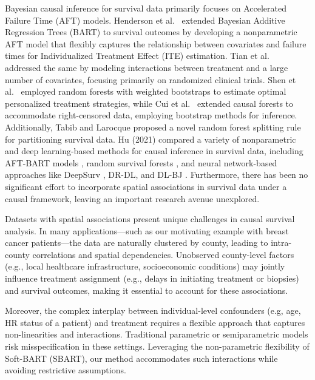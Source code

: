 \documentclass[useAMS,referee]{biom}
\begin{document}
Bayesian causal inference for survival data primarily focuses on Accelerated Failure Time (AFT) models. Henderson et al.\ \parencite{henderson2017bayesian} extended Bayesian Additive Regression Trees (BART) to survival outcomes by developing a nonparametric AFT model that flexibly captures the relationship between covariates and failure times for Individualized Treatment Effect (ITE) estimation. Tian et al.\ \parencite{tian2014survival} addressed the same by modeling interactions between treatment and a large number of covariates, focusing primarily on randomized clinical trials. Shen et al.\ \parencite{shen2018personalized} employed random forests with weighted bootstraps to estimate optimal personalized treatment strategies, while Cui et al.\ \parencite{cui2017causal} extended causal forests \parencite{wager2018estimation} to accommodate right-censored data, employing bootstrap methods for inference. Additionally, Tabib and Larocque \parencite{tabib2018splitting} proposed a novel random forest splitting rule for partitioning survival data. Hu (2021)\parencite{hu2021estimating} compared a variety of nonparametric and deep learning-based methods for causal inference in survival data, including AFT-BART models \parencite{henderson2017bayesian}, random survival forests \parencite{Ishwaran08}, and neural network-based approaches like DeepSurv \parencite{katzman2018deep}, DR-DL, and DL-BJ \parencite{kvamme2019time, lee2020causal}. Furthermore, there has been no significant effort to incorporate spatial associations in survival data under a causal framework, leaving an important research avenue unexplored.

 
Datasets with spatial associations present unique challenges in causal survival analysis. In many applications—such as our motivating example with breast cancer patients—the data are naturally clustered by county, leading to intra-county correlations and spatial dependencies. Unobserved county-level factors (e.g., local healthcare infrastructure, socioeconomic conditions) may jointly influence treatment assignment (e.g., delays in initiating treatment or biopsies) and survival outcomes, making it essential to account for these associations.

Moreover, the complex interplay between individual-level confounders (e.g, age, HR status of a patient) and treatment requires a flexible approach that captures non-linearities and interactions. Traditional parametric or semiparametric models risk misspecification in these settings. Leveraging the non-parametric flexibility of Soft-BART (SBART), our method accommodates such interactions while avoiding restrictive assumptions.
\end{document}
